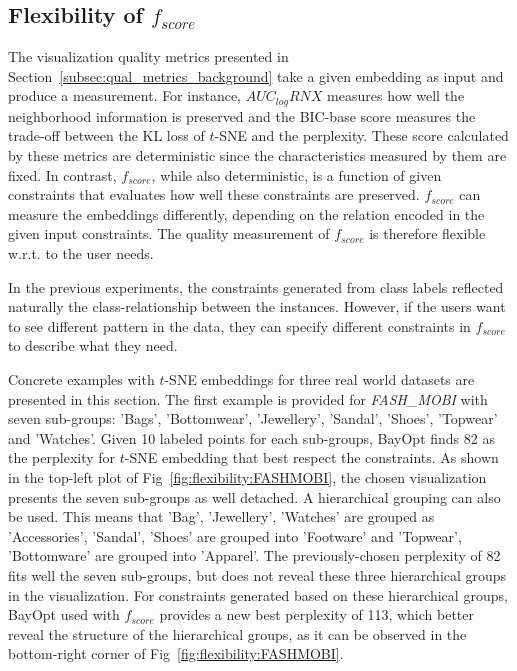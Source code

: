 \subsection{Flexibility of $f_{score}$}\label{sec:result:flexibility}
The visualization quality metrics presented in Section~\ref{subsec:qual_metrics_background} take a given embedding as input and produce a measurement.
For instance, $AUC_{log}RNX$ measures how well the neighborhood information is preserved and the BIC-base score measures the trade-off between the KL loss of $t$-SNE and the perplexity.
These score calculated by these metrics are deterministic since the characteristics measured by them are fixed.
In contrast, $f_{score}$, while also deterministic, is a function of given constraints that evaluates how well these constraints are preserved.
$f_{score}$ can measure the embeddings differently, depending on the relation encoded in the given input constraints. The quality measurement of $f_{score}$ is therefore flexible w.r.t. to the user needs.

In the previous experiments, the constraints generated from class labels reflected naturally the class-relationship between the instances.
However, if the users want to see different pattern in the data, they can specify different constraints in $f_{score}$ to describe what they need.

Concrete examples with $t$-SNE embeddings for three real world datasets are presented in this section.
The first example is provided for \emph{FASH\_MOBI} with seven sub-groups: 'Bags', 'Bottomwear', 'Jewellery', 'Sandal', 'Shoes', 'Topwear' and 'Watches'.
Given 10 labeled points for each sub-groups, BayOpt finds 82 as the perplexity for $t$-SNE embedding that best respect the constraints.
As shown in the top-left plot of Fig~\ref{fig:flexibility:FASHMOBI}, the chosen visualization presents the seven sub-groups as well detached.
A hierarchical grouping can also be used. This means that 'Bag', 'Jewellery', 'Watches' are grouped as 'Accessories', 'Sandal', 'Shoes' are grouped into 'Footware' and 'Topwear', 'Bottomware' are grouped into 'Apparel'.
The previously-chosen perplexity of 82 fits well the seven sub-groups, but does not reveal these three hierarchical groups in the visualization.
For constraints generated based on these hierarchical groups, BayOpt used with $f_{score}$ provides a new best perplexity of 113, which better reveal the structure of the hierarchical groups, as it can be observed in the bottom-right corner of Fig~\ref{fig:flexibility:FASHMOBI}.

